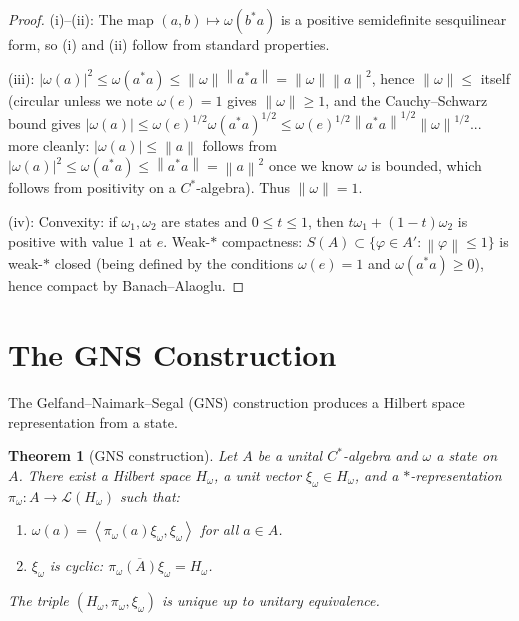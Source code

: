 \documentclass[a4paper,12pt]{book}
\newcommand{\norm}[1]{\left\| #1 \right\|}
\newcommand{\abs}[1]{\left| #1 \right|}
\newcommand{\inner}[2]{\left\langle #1, #2 \right\rangle}
\theoremstyle{definition}
\theoremstyle{plain}
\newtheorem{theorem}[definition]{Theorem}
\theoremstyle{remark}
\begin{document}
\begin{proof}
(i)--(ii): The map $(a,b) \mapsto \omega(b^*a)$ is a positive semidefinite
sesquilinear form, so (i) and (ii) follow from standard properties.

(iii): $\abs{\omega(a)}^2 \le \omega(a^*a) \le \norm{\omega}\norm{a^*a}
= \norm{\omega}\norm{a}^2$, hence $\norm{\omega} \le$ itself (circular unless
we note $\omega(e) = 1$ gives $\norm{\omega} \ge 1$, and the Cauchy--Schwarz
bound gives $\abs{\omega(a)} \le \omega(e)^{1/2}\omega(a^*a)^{1/2}
\le \omega(e)^{1/2}\norm{a^*a}^{1/2}\norm{\omega}^{1/2}$... more cleanly:
$\abs{\omega(a)} \le \norm{a}$ follows from $\abs{\omega(a)}^2 \le \omega(a^*a)
\le \norm{a^*a} = \norm{a}^2$ once we know $\omega$ is bounded, which follows
from positivity on a $C^*$-algebra). Thus $\norm{\omega} = 1$.

(iv): Convexity: if $\omega_1, \omega_2$ are states and $0 \le t \le 1$, then
$t\omega_1 + (1-t)\omega_2$ is positive with value $1$ at $e$. Weak-$*$
compactness: $S(A) \subset \{\varphi \in A' : \norm{\varphi} \le 1\}$ is weak-$*$
closed (being defined by the conditions $\omega(e) = 1$ and $\omega(a^*a) \ge 0$),
hence compact by Banach--Alaoglu.
\end{proof}


\section{The GNS Construction}\label{sec:gns}


The Gelfand--Naimark--Segal (GNS) construction produces a Hilbert space
representation from a state.

\begin{theorem}[GNS construction]\label{thm:gns}
Let $A$ be a unital $C^*$-algebra and $\omega$ a state on $A$. There exist a
Hilbert space $H_\omega$, a unit vector $\xi_\omega \in H_\omega$, and a
$*$-representation $\pi_\omega \colon A \to \mathcal{L}(H_\omega)$ such that:
\begin{enumerate}[label=(\roman*)]
  \item $\omega(a) = \inner{\pi_\omega(a)\xi_\omega}{\xi_\omega}$ for all $a \in A$.
  \item $\xi_\omega$ is cyclic: $\overline{\pi_\omega(A)\xi_\omega} = H_\omega$.
\end{enumerate}
The triple $(H_\omega, \pi_\omega, \xi_\omega)$ is unique up to unitary equivalence.
\end{theorem}
\end{document}
